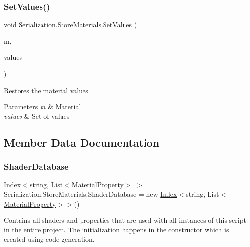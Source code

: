 \subsubsection{\texorpdfstring{Set\+Values()}{SetValues()}}
{\footnotesize\ttfamily void Serialization.\+Store\+Materials.\+Set\+Values (\begin{DoxyParamCaption}\item[{Material}]{m,  }\item[{I\+Enumerable$<$ \hyperlink{class_serialization_1_1_store_materials_1_1_stored_value}{Stored\+Value} $>$}]{values }\end{DoxyParamCaption})\hspace{0.3cm}{\ttfamily [inline]}}



Restores the material values 


\begin{DoxyParams}{Parameters}
{\em m} & Material\\
\hline
{\em values} & Set of values\\
\hline
\end{DoxyParams}


\subsection{Member Data Documentation}
\mbox{\label{class_serialization_1_1_store_materials_a2c506682608604ebb0e991f83162c99f}} 
\subsubsection{\texorpdfstring{Shader\+Database}{ShaderDatabase}}
{\footnotesize\ttfamily \hyperlink{class_index}{Index}$<$string, List$<$\hyperlink{class_serialization_1_1_store_materials_1_1_material_property}{Material\+Property}$>$ $>$ Serialization.\+Store\+Materials.\+Shader\+Database = new \hyperlink{class_index}{Index}$<$string, List$<$\hyperlink{class_serialization_1_1_store_materials_1_1_material_property}{Material\+Property}$>$$>$()\hspace{0.3cm}{\ttfamily [static]}}



Contains all shaders and properties that are used with all instances of this script in the entire project. The initialization happens in the constructor which is created using code generation. 



